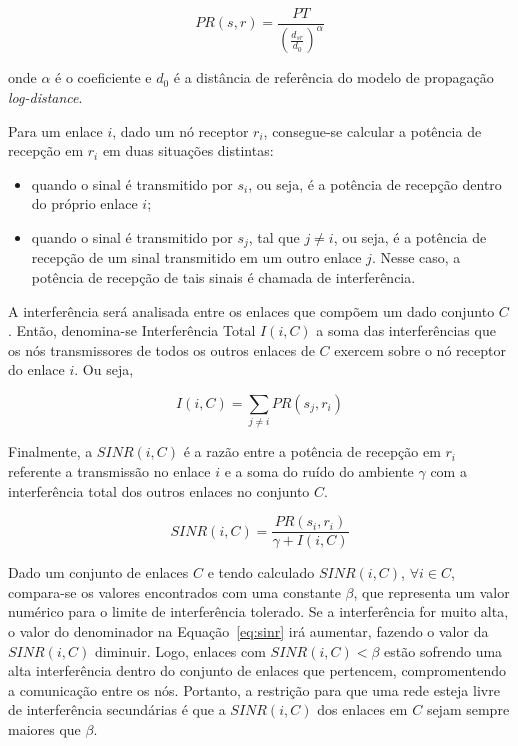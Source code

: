 \begin{equation}
PR(s,r) = \frac{PT}{(\frac{d_{sr}}{d_{0}})^{\alpha}}
\label{eq:rp}
\end{equation}

onde $\alpha$ é o coeficiente e $d_{0}$ é a distância de referência do modelo de propagação {\it log-distance}.

Para um enlace $i$, dado um nó receptor $r_{i}$, consegue-se calcular a potência de recepção em $r_{i}$ em duas situações distintas:

\begin{itemize} %

\item quando o sinal é transmitido por $s_{i}$, ou seja, é a potência de recepção dentro do próprio enlace $i$; 
\item quando o sinal é transmitido por $s_{j}$, tal que $j \neq i$, ou seja, é a potência de recepção de um sinal transmitido em um outro enlace $j$. Nesse caso, a potência de recepção de tais sinais é chamada de interferência. 

\end{itemize}

A interferência será analisada entre os enlaces que compõem um dado conjunto $C$. Então, denomina-se Interferência Total $I(i,C)$ a soma das interferências que os nós transmissores de todos os outros enlaces de $C$ exercem sobre o nó receptor do enlace $i$. Ou seja,

\begin{equation}
I(i,C) = \sum_{j \neq i} PR(s_{j},r_{i})
\end{equation}

Finalmente, a $SINR(i,C)$ é a razão entre a potência de recepção em $r_{i}$ referente a transmissão no enlace $i$ e a soma do ruído do ambiente $\gamma$ com a interferência total dos outros enlaces no conjunto $C$.

\begin{equation}
SINR(i,C) = \frac{PR(s_{i},r_{i})} {\gamma + I(i,C)}
\label{eq:sinr}  
\end{equation}

Dado um conjunto de enlaces $C$ e tendo calculado $SINR(i,C)$, $\forall i \in C$, compara-se os valores encontrados com uma constante $\beta$, que representa um valor numérico para o limite de interferência tolerado. Se a interferência for muito alta, o valor do denominador na Equação~\ref{eq:sinr} irá aumentar, fazendo o valor da $SINR(i,C)$ diminuir. Logo, enlaces com $SINR(i,C)<\beta$ estão sofrendo uma alta interferência dentro do conjunto de enlaces que pertencem, compromentendo a comunicação entre os nós. Portanto, a restrição para que uma rede esteja livre de interferência secundárias é que a $SINR(i,C)$ dos enlaces em $C$ sejam sempre maiores que $\beta$.

